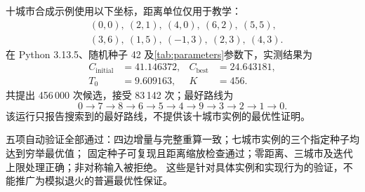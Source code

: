 \documentclass[UTF8,a4paper,11pt,fontset=none]{ctexart}
\numberwithin{equation}{section}
\newcommand{\best}{\mathrm{best}}
\begin{document}
十城市合成示例使用以下坐标，距离单位仅用于教学：
\begin{equation*}
  \begin{aligned}
    &(0,0),\ (2,1),\ (4,0),\ (6,2),\ (5,5),\\
    &(3,6),\ (1,5),\ (-1,3),\ (2,3),\ (4,3).
  \end{aligned}
\end{equation*}
在 Python 3.13.5、随机种子 42 及\cref{tab:parameters}参数下，实测结果为
\begin{equation*}
  \begin{aligned}
    C_{\mathrm{initial}}&=41.146372,&
    C_{\best}&=24.643181,\\
    T_0&=9.609163,&
    K&=456.
  \end{aligned}
\end{equation*}
共提出 456\,000 次候选，接受 83\,142 次；最好路线为
\begin{equation*}
  0\to7\to8\to6\to5\to4\to9\to3\to2\to1\to0.
\end{equation*}
该运行只报告搜索到的最好路线，不提供该十城市实例的最优性证明。

五项自动验证全部通过：四边增量与完整重算一致；七城市实例的三个指定种子均达到穷举最优值；
固定种子可复现且距离缩放检查通过；零距离、三城市及迭代上限处理正确；非对称输入被拒绝。
这些是针对具体实例和实现行为的验证，不能推广为模拟退火的普遍最优性保证。

\clearpage

\end{document}
